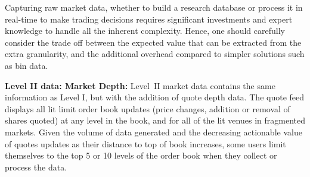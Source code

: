 Capturing raw market data, whether to build a research database or process it in real-time to make trading decisions requires significant investments and expert knowledge to handle all the inherent complexity. Hence, one should carefully consider the trade off between the expected value that can be extracted from the extra granularity, and the additional overhead compared to simpler solutions such as bin data. \twomedskip


\noindent\textbf{Level II data: Market Depth:}  Level~II market data contains the same information as Level I, but with the addition of quote depth data. The quote feed displays all lit limit order book updates (price changes, addition or removal of shares quoted) at any level in the book, and for all of the lit venues in fragmented markets. Given the volume of data generated and the decreasing actionable value of quotes updates as their distance to top of book increases, some users limit themselves to the top 5 or 10 levels of the order book  when they collect or process the data. \twomedskip


